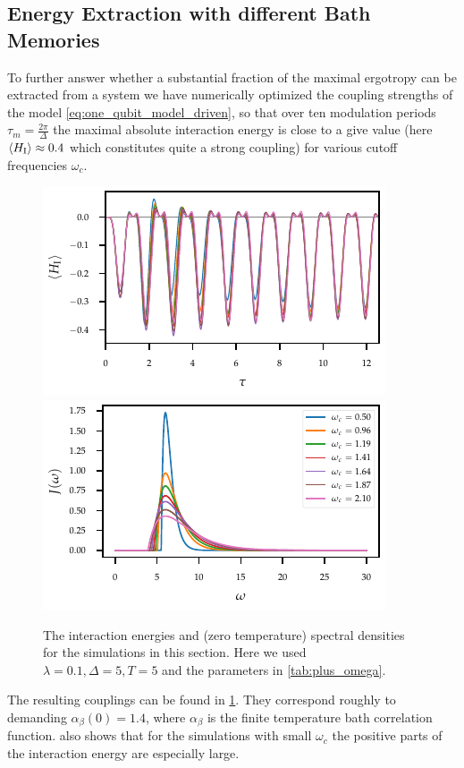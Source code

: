 \subsection{Energy Extraction with different Bath Memories}
\label{sec:extr_mem}
To further answer whether a substantial fraction of the maximal
ergotropy can be extracted from a system we have numerically optimized
the coupling strengths of the model \cref{eq:one_qubit_model_driven},
so that over ten modulation periods \(τ_{m} = \frac{2 π}{Δ}\) the
maximal absolute interaction energy is close to a give value (here
\(\ev{H_{\inter}}\approx 0.4\) which constitutes quite a strong
coupling) for various cutoff frequencies \(ω_{c}\).
\begin{figure}[h]
  \centering
  \includegraphics{figs/one_bath_mod/omega_interactions}
  \includegraphics{figs/one_bath_mod/omega_sd}
  \caption{\label{fig:omega_couplings_and_energies} The interaction
    energies and (zero temperature) spectral densities for the
    simulations in this section. Here we used \(λ=0.1, Δ=5, T=5\) and
    the parameters in \cref{tab:plus_omega}.}
\end{figure}

The resulting couplings can be found in
\cref{fig:omega_couplings_and_energies}. They correspond roughly to
demanding \(α_{β}(0)=1.4\), where \(α_{β}\) is the finite temperature
bath correlation function.
 also shows that for the
simulations with small \(ω_{c}\) the positive parts of the interaction
energy are especially large.

